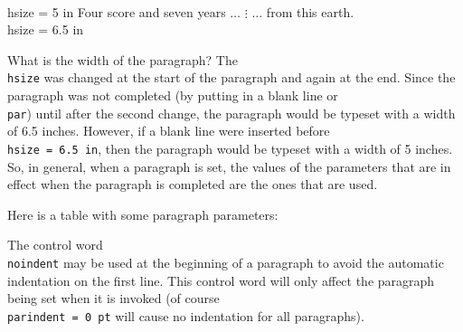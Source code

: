\beginuser 
\\hsize = 5 in 
Four score and seven years $\ldots$ 
$\vdots$ 
$\ldots$ from this earth. 
\\hsize = 6.5 in 

\enduser 

What is the width of the paragraph?  The {\tt \\hsize} was 
changed at the start of the paragraph and again at the end. 
Since the paragraph was not completed (by putting in a blank line 
or {\tt \\par}) until after the second change, the paragraph 
would be typeset with a width of 6.5 inches. However, if a blank 
line were inserted before {\tt \\hsize = 6.5 in}, then the 
paragraph would be typeset with a width of 5 inches.  So, in 
general, when a paragraph is set, the values of the parameters 
that are in effect when the paragraph is completed are the ones 
that are used. 

Here is a table with some paragraph parameters: 



The control word {\tt \\noindent} may be used at the beginning of 
a paragraph to avoid the automatic indentation on the first line. 
This control word will only affect the paragraph being set when 
it is invoked (of course {\tt \\parindent = 0 pt} will cause no 
indentation for all paragraphs). 

